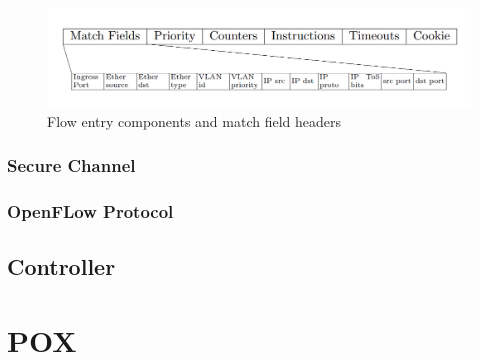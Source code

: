 \begin{figure}[h]
\centering
\includegraphics[width=1\textwidth]{./images/FlowEntryFormat.jpg}
\caption{Flow entry components and match field headers} \label{fig:FlowEntryComponents}
\end{figure}


\subsubsection{Secure Channel}
\label{subsec:SCSecureChannel}

\subsubsection{OpenFLow Protocol}
\label{subsec:OFProtocolSC}

\subsection{Controller}
\label{subsec:OFController}

\section{POX}
\label{sec:BGPOX}
